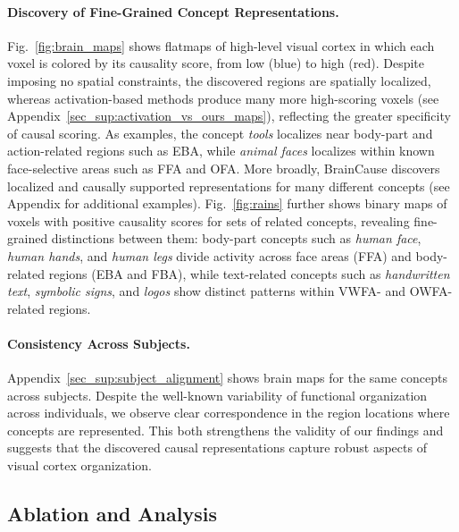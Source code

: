 \documentclass{llmxive}
\begin{document}
\paragraph{Discovery of Fine-Grained Concept Representations.}
Fig.~\ref{fig:brain_maps} shows flatmaps of high-level visual cortex in which each voxel is colored by its causality score, from low (blue) to high (red). Despite imposing no spatial constraints, the discovered regions are spatially localized, whereas activation-based methods produce many more high-scoring voxels (see Appendix~\ref{sec_sup:activation_vs_ours_maps}), reflecting the greater specificity of causal scoring. As examples, the concept \emph{tools} localizes near body-part and action-related regions such as EBA, while \emph{animal faces} localizes within known face-selective areas such as FFA and OFA. More broadly, BrainCause discovers localized and causally supported representations for many different concepts (see Appendix for additional examples). Fig.~\ref{fig:rains} further shows binary maps of voxels with positive causality scores for sets of related concepts, revealing fine-grained distinctions between them: body-part concepts such as \emph{human face}, \emph{human hands}, and \emph{human legs} divide activity across face areas (FFA) and body-related regions (EBA and FBA), while text-related concepts such as \emph{handwritten text}, \emph{symbolic signs}, and \emph{logos} show distinct patterns within VWFA- and OWFA-related regions.


\paragraph{Consistency Across Subjects.}
Appendix~\ref{sec_sup:subject_alignment} shows brain maps for the same concepts across subjects. Despite the well-known variability of functional organization across individuals, we observe clear correspondence in the region locations where concepts are represented. This both strengthens the validity of our findings and suggests that the discovered causal representations capture robust aspects of visual cortex organization.


\subsection{Ablation and Analysis}
\end{document}
